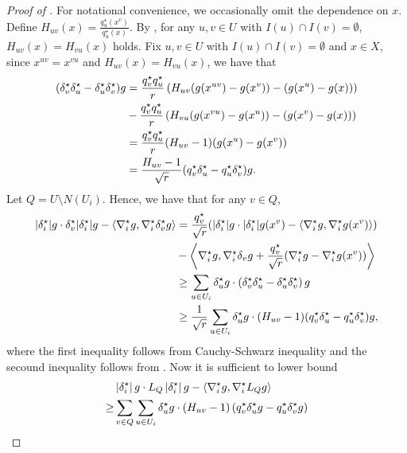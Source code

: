 \begin{proof}[Proof of ]
    For notational convenience, we occasionally omit the dependence on $x$.
    Define $H_{uv}(x) = \frac{q_u^\star(x^v)}{q_u^\star(x)}$.
    By , for any $u,v\in U$ with $I(u)\cap I(v) = \emptyset$, $H_{uv}(x) = H_{vu}(x)$ holds.
    Fix $u,v\in U$ with $I(u)\cap I(v) = \emptyset$ and $x\in X$, since $x^{uv} = x^{vu}$ and $H_{uv}(x) = H_{vu}(x)$, we have that
    \begin{align}
        (\delta_v^\star \delta_u^\star - \delta_u^\star \delta_v^\star)g &= \frac{q_v^\star q_u^\star}{r}\left(H_{uv}(g(x^{uv}) - g(x^v)) - (g(x^u)-g(x))\right) \nonumber
        \\&-\frac{q_v^\star q_u^\star}{r}\left(H_{vu}(g(x^{vu}) - g(x^u)) - (g(x^v)-g(x))\right) \nonumber
        \\&= \frac{q_v^\star q_u^\star}{r}(H_{uv}-1)(g(x^u) - g(x^v)) \nonumber
        \\&= \frac{H_{uv}-1}{\sqrt r}(q_v^\star \delta_u^\star - q_u^\star  \delta_v^\star) g. \label{eq:commutator-SGraph}
    \end{align}
    Let $Q = U\setminus N(U_i)$.
    Hence, we have that for any $v\in Q$,
    \begin{align}
        |\delta_i^\star| g \cdot \delta_v^\star |\delta_i^\star| g - \left\langle \nabla_i^\star g,\nabla_i^\star \delta_v^\star g\right\rangle
        &= \frac{q_v^\star}{\sqrt r} (|\delta_i^\star| g\cdot  |\delta_i^\star| g(x^v) - \left\langle \nabla_i^\star g,\nabla_i^\star g(x^v)\right\rangle) \nonumber
        \\&- \left\langle \nabla_i^\star g,\nabla_i^\star \delta_v g  + \frac{q_v^\star}{\sqrt r}(\nabla_i^\star g - \nabla_i^\star g(x^v))\right\rangle \nonumber
        \\&\geq \sum_{u\in U_i} \delta_u^\star g \cdot \left(\delta_v^\star \delta_u^\star - \delta_u^\star \delta_v^\star\right) g  \nonumber
        \\&\geq \frac 1{\sqrt r}\sum_{u\in U_i} \delta^\star_u g \cdot (H_{uv}-1)(q_v^\star \delta_u^\star - q_u^\star  \delta_v^\star) g,
    \end{align}
    where the first inequality follows from Cauchy-Schwarz inequality and the secound inequality follows from .
    Now it is sufficient to lower bound 
    \begin{align}
        &\abs{\delta^\star_i} g\cdot L_Q \abs{\delta^\star_i} g -  \inner{\grad_i^\star g}{\grad_i^\star L_Q g} \nonumber
        \\\geq &\sum_{v\in Q}\sum_{u\in U_i} \delta^\star_u g \cdot (H_{uv}-1)\tp{q_v^\star \delta_u^\star g - q_u^\star  \delta_v^\star g} \nonumber

\end{align}
\end{proof}
